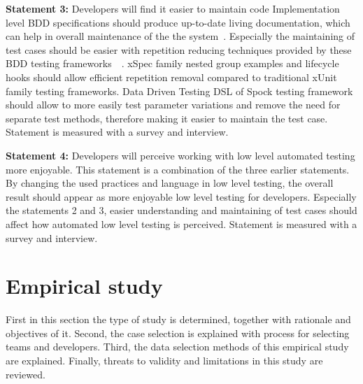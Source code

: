     \begin{addmargin}[0em]{0em}
    \vspace{10px}
    \textbf{Statement 3:} Developers will find it easier to maintain code
    \vspace{5px}
    \newline
    Implementation level BDD specifications should produce up-to-date living documentation, which can help in overall
    maintenance of the the system~\cite{smart2014bdd}. Especially the maintaining of test cases should be easier
    with repetition reducing techniques provided by these BDD testing frameworks~\cite{chelimsky2010rspec}~\cite{kapelonis2016java}.
    xSpec family nested group examples and lifecycle hooks should allow efficient repetition removal compared to traditional xUnit family testing frameworks.
    Data Driven Testing DSL of Spock testing framework should allow to more easily test parameter variations and remove
    the need for separate test methods, therefore making it easier to maintain the test case.
    Statement is measured with a survey and interview.
    \end{addmargin}

    \begin{addmargin}[0em]{0em}
    \vspace{10px}
    \textbf{Statement 4:} Developers will perceive working with low level automated testing more enjoyable.
    \vspace{5px}
    \newline
    This statement is a combination of the three earlier statements. By changing the used practices and language in low level testing,
    the overall result should appear as more enjoyable low level testing for developers. Especially the statements 2 and 3, easier understanding
    and maintaining of test cases should affect how automated low level testing is perceived.
    Statement is measured with a survey and interview.
    \end{addmargin}

\section{Empirical study}
First in this section the type of study is determined, together with rationale and objectives of it. Second, the case selection
is explained with process for selecting teams and developers. Third, the data selection methods of this empirical study are
explained. Finally, threats to validity and limitations in this study are reviewed.

